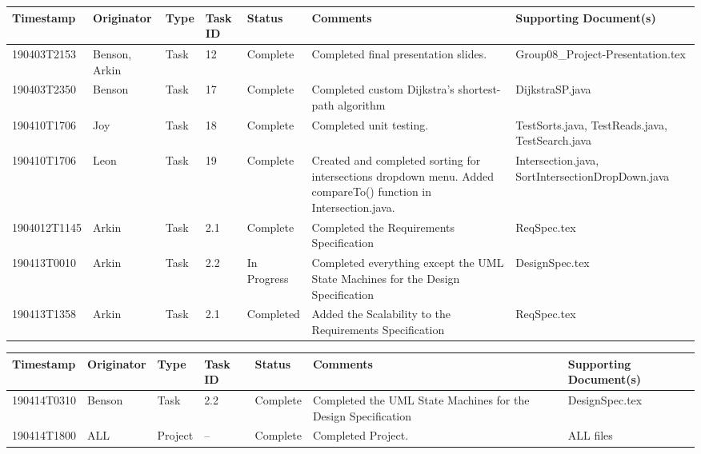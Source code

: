\documentclass[12pt]{article}
\begin{document}
\begin{center}
    \begin{tabular}{| P{2.5cm} | P{2.2cm} | P{1.4cm} | P{0.9cm} | P{1.9cm} | P{2.8cm} | P{3cm} |}
        \hline
        \textbf{Timestamp} & \textbf{Originator} & \textbf{Type} 
        & \textbf{Task ID} & \textbf{Status} & \textbf{Comments} 
        & \textbf{Supporting Document(s)}\\
        \hline
        190403T2153 & Benson, Arkin & Task & 12 & Complete & Completed final presentation slides. & Group08\_Project-Presentation.tex \\
        \hline
        190403T2350 & Benson & Task & 17 & Complete & Completed custom Dijkstra's shortest-path algorithm & DijkstraSP.java \\
        \hline
        190410T1706 & Joy & Task & 18 & Complete & Completed unit testing. & TestSorts.java, TestReads.java, TestSearch.java \\
        \hline
        190410T1706 & Leon & Task & 19 & Complete & Created and completed sorting for intersections dropdown menu. Added compareTo() function in Intersection.java.
        & Intersection.java, SortIntersectionDropDown.java \\
        \hline
        1904012T1145 & Arkin & Task & 2.1 & Complete & Completed the Requirements Specification & ReqSpec.tex \\
        \hline
        190413T0010 & Arkin & Task & 2.2 & In Progress & Completed everything except the UML State Machines for the Design Specification & DesignSpec.tex \\
        \hline
        190413T1358 & Arkin & Task & 2.1 & Completed & Added the Scalability to the Requirements Specification & ReqSpec.tex \\
        \hline
    \end{tabular}
    
    \begin{tabular}{| P{2.5cm} | P{2.2cm} | P{1.4cm} | P{0.9cm} | P{1.9cm} | P{2.8cm} | P{3cm} |}
        \hline
        \textbf{Timestamp} & \textbf{Originator} & \textbf{Type} 
        & \textbf{Task ID} & \textbf{Status} & \textbf{Comments} 
        & \textbf{Supporting Document(s)}\\
        \hline
        190414T0310 & Benson & Task & 2.2 & Complete & Completed the UML State Machines for the Design Specification & DesignSpec.tex \\
        \hline
        190414T1800 & ALL & Project & -- & Complete & Completed Project. & ALL files \\
        \hline
    \end{tabular}
    \end{center}
\end{document}
